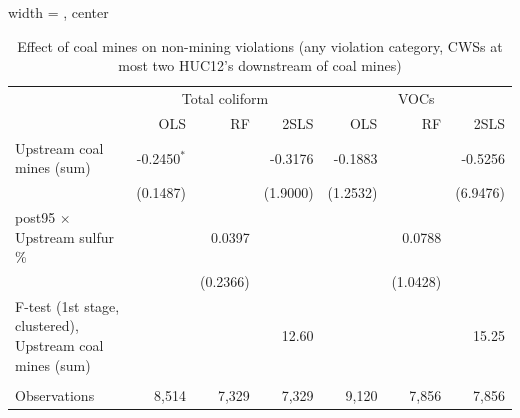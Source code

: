 
\begin{table}[htbp]
   
   \caption{\label{2sls_dwnstrm2step_nonminevio_allcat_ivsum} Effect of coal mines on non-mining violations (any violation category, CWSs at most two HUC12's downstream of coal mines)}
   \bigskip
   
   \centering
   
   \begin{adjustbox}{width = \textwidth, center}
      
      
      \begin{tabular}{lrrrrrr}
         \toprule
         
          & \multicolumn{3}{c}{Total coliform} & \multicolumn{3}{c}{VOCs}\\
         
                                                                  & OLS           & RF       & 2SLS     & OLS      & RF       & 2SLS\\  
         
         \midrule 
         Upstream coal mines (sum)                                & -0.2450$^{*}$ &          & -0.3176  & -0.1883  &          & -0.5256\\   
                                                                  & (0.1487)      &          & (1.9000) & (1.2532) &          & (6.9476)\\   
         post95 $\times$ Upstream sulfur \%                       &               & 0.0397   &          &          & 0.0788   &   \\   
                                                                  &               & (0.2366) &          &          & (1.0428) &   \\   
         
         F-test (1st stage, clustered), Upstream coal mines (sum) &               &          & 12.60    &          &          & 15.25\\  
         
          \\
         
         Observations                                             & 8,514         & 7,329    & 7,329    & 9,120    & 7,856    & 7,856\\  
         
         \bottomrule
         
      \end{tabular}
      

\end{adjustbox}
\end{table}
